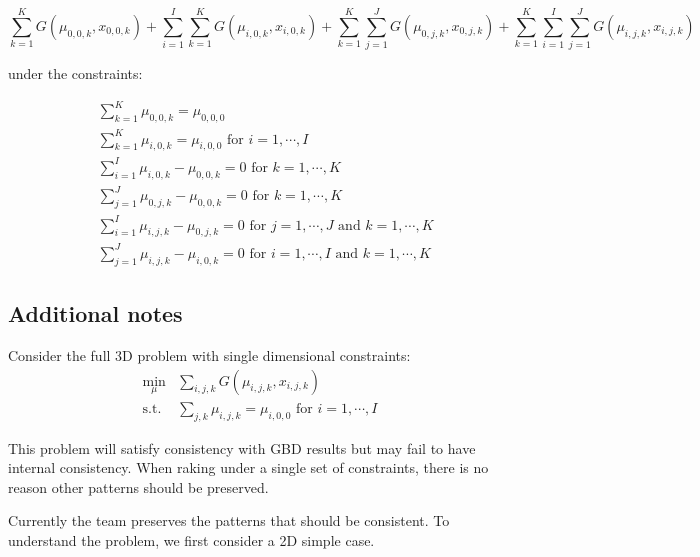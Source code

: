 \documentclass{tex/note}
\begin{document}
\begin{equation*}
\sum_{k = 1}^K G \left( \mu_{0,0,k} , x_{0,0,k} \right) + \sum_{i = 1}^I \sum_{k = 1}^K G \left( \mu_{i,0,k} , x_{i,0,k} \right) + \sum_{k = 1}^K \sum_{j = 1}^J G \left( \mu_{0,j,k} , x_{0,j,k} \right) + \sum_{k = 1}^K \sum_{i = 1}^I \sum_{j = 1}^J G \left( \mu_{i,j,k} , x_{i,j,k} \right)
\end{equation*}

under the constraints:

\begin{align*}
& \sum_{k = 1}^K \mu_{0,0,k} = \mu_{0,0,0} \\
& \sum_{k = 1}^K \mu_{i,0,k} = \mu_{i,0,0} \text{ for } i = 1 , \cdots , I \\
& \sum_{i = 1}^I \mu_{i,0,k} - \mu_{0,0,k} = 0 \text{ for } k = 1 , \cdots , K \\
& \sum_{j = 1}^J \mu_{0,j,k} - \mu_{0,0,k} = 0 \text{ for } k = 1 , \cdots , K \\
& \sum_{i = 1}^I \mu_{i,j,k} - \mu_{0,j,k} = 0 \text{ for } j = 1 , \cdots , J \text{ and } k = 1 , \cdots , K\\
& \sum_{j = 1}^J \mu_{i,j,k} - \mu_{i,0,k} = 0 \text{ for } i = 1 , \cdots , I  \text{ and } k = 1 , \cdots , K
\end{align*}

\subsection{Additional notes}

Consider the full 3D problem with single dimensional constraints: 
\[
\begin{aligned}
\min_\mu &\sum_{i,j,k} G \left( \mu_{i,j,k} , x_{i,j,k} \right) \\
\mbox{s.t.}  & \sum_{j,k} \mu_{i,j,k} = \mu_{i,0,0} \text{ for } i = 1 , \cdots , I
\end{aligned}
\]

This problem will satisfy consistency with GBD results but may fail to have internal consistency. When raking under a single set of constraints, there is no reason other patterns should be preserved. 

Currently the team preserves the patterns that should be consistent. To understand the problem, we first consider a 2D simple case. 
\end{document}
